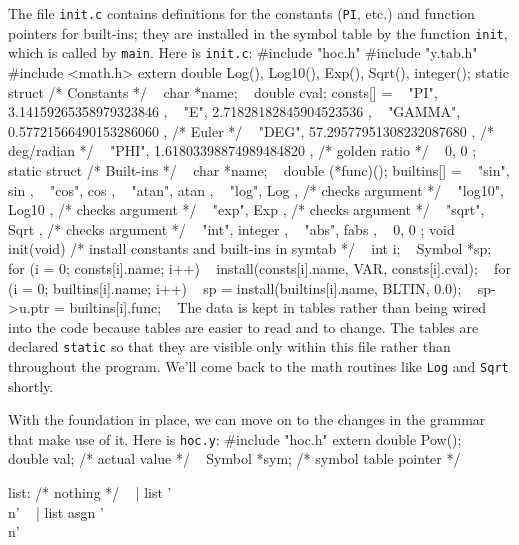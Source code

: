 {The file {\tt init.c} contains definitions for the constants
({\tt PI}, etc.) and function pointers for built-ins; they are
installed in the symbol table by the function {\tt init},
which is called by {\tt main}. Here is {\tt init.c}:
\begincode
#include "hoc.h"
#include "y.tab.h"
#include <math.h>
\medskip
extern double Log(), Log10(), Exp(), Sqrt(), integer();
\medbreak
static struct {        /* Constants */
~   char    *name;
~   double  cval;
} consts[] = {
~   { "PI",    3.14159265358979323846 },
~   { "E",     2.71828182845904523536 },
~   { "GAMMA", 0.57721566490153286060 },  /* Euler */
~   { "DEG",  57.29577951308232087680 },  /* deg/radian */
~   { "PHI",   1.61803398874989484820 },  /* golden ratio */
~   { 0,       0 }
};
\medbreak
static struct {        /* Built-ins */
~   char    *name;
~   double  (*func)();
} builtins[] = {
~   { "sin",    sin     },
~   { "cos",    cos     },
~   { "atan",   atan    },
~   { "log",    Log     },  /* checks argument */
~   { "log10",  Log10   },  /* checks argument */
~   { "exp",    Exp     },  /* checks argument */
~   { "sqrt",   Sqrt    },  /* checks argument */
~   { "int",    integer },
~   { "abs",    fabs    },
~   { 0,        0       }
};
\medbreak
void init(void)  /* install constants and built-ins in symtab */
{
~       int i;
~       Symbol *sp;
\smallbreak
~       for (i = 0; consts[i].name; i++)
~               install(consts[i].name, VAR, consts[i].cval);
~       for (i = 0; builtins[i].name; i++) {
~               sp = install(builtins[i].name, BLTIN, 0.0);
~               sp->u.ptr = builtins[i].func;
~       }
}
\endcode
\noindent
The data is kept in tables rather than being wired into the
code because tables are easier to read and to change. The tables
are declared {\tt static} so that they are visible only within
this file rather than throughout the program. We'll come back
to the math routines like {\tt Log} and {\tt Sqrt} shortly.

With the foundation in place, we can move on to the changes
in the grammar that make use of it. Here is {\tt hoc.y}:
\begincode
#include "hoc.h"
extern double Pow();
~       double  val;    /* actual value */
~       Symbol *sym;    /* symbol table pointer */
}
list:     /* nothing */
~       | list       '\\n'
~       | list asgn  '\\n'
